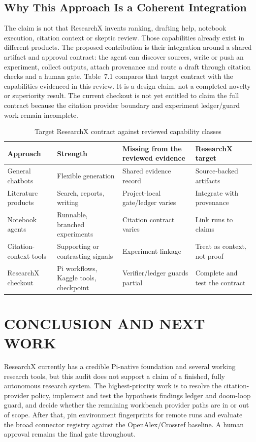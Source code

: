 \documentclass[12pt,a4paper]{report}
\numberwithin{equation}{chapter}
\begin{document}
\section{Why This Approach Is a Coherent Integration}
The claim is not that ResearchX invents ranking, drafting help, notebook
execution, citation context or skeptic review. Those capabilities already
exist in different products. The proposed contribution is their integration
around a shared artifact and approval contract: the agent can discover
sources, write or push an experiment, collect outputs, attach provenance and
route a draft through citation checks and a human gate. Table~7.1 compares
that target contract with the capabilities evidenced in this review. It is a
design claim, not a completed novelty or superiority result. The current
checkout is not yet entitled to claim the full contract because the citation
provider boundary and experiment ledger/guard work remain incomplete.

\begin{table}[ht]
\centering
\caption{Target ResearchX contract against reviewed capability classes}
\begin{tabular}{@{}L{3.1cm}L{3.1cm}L{4.0cm}L{3.4cm}@{}}
\toprule
Approach & Strength & Missing from the reviewed evidence & ResearchX target \\
\midrule
General chatbots & Flexible generation & Shared evidence record & Source-backed artifacts \\
Literature products & Search, reports, writing & Project-local gate/ledger varies & Integrate with provenance \\
Notebook agents & Runnable, branched experiments & Citation contract varies & Link runs to claims \\
Citation-context tools & Supporting or contrasting signals & Experiment linkage & Treat as context, not proof \\
ResearchX checkout & Pi workflows, Kaggle tools, checkpoint & Verifier/ledger guards partial & Complete and test the contract \\
\bottomrule
\end{tabular}
\end{table}

\chapter{CONCLUSION AND NEXT WORK}

ResearchX currently has a credible Pi-native foundation and several working
research tools, but this audit does not support a claim of a finished,
fully autonomous research system. The highest-priority work is to resolve
the citation-provider policy, implement and test the hypothesis findings
ledger and doom-loop guard, and decide whether the remaining workbench
provider paths are in or out of scope. After that, pin environment
fingerprints for remote runs and evaluate the broad connector registry
against the OpenAlex/Crossref baseline. A human approval remains the final
gate throughout.
\end{document}
